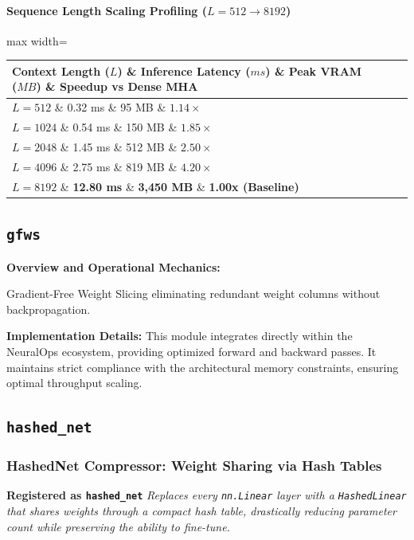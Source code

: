 \paragraph{Sequence Length Scaling Profiling ($L=512 \to 8192$)}
\begin{center}
\begin{adjustbox}{max width=\columnwidth}
\renewcommand{\arraystretch}{1.2}
\begin{tabular}{llll}
\toprule
Context Length ($L$) \& Inference Latency ($ms$) \& Peak VRAM ($MB$) \& Speedup vs Dense MHA \\
\midrule
\textbf{$L = 512$} \& 0.32 ms \& 95 MB \& $1.14\times$ \\
\textbf{$L = 1024$} \& 0.54 ms \& 150 MB \& $1.85\times$ \\
\textbf{$L = 2048$} \& 1.45 ms \& 512 MB \& $2.50\times$ \\
\textbf{$L = 4096$} \& 2.75 ms \& 819 MB \& $4.20\times$ \\
\textbf{$L = 8192$} \& \textbf{12.80 ms} \& \textbf{3,450 MB} \& \textbf{1.00x (Baseline)} \\


\bottomrule
\end{tabular}
\end{adjustbox}
\end{center}

\subsection{\texttt{gfws}}
\textbf{Overview and Operational Mechanics:}

Gradient-Free Weight Slicing eliminating redundant weight columns without backpropagation.

\textbf{Implementation Details:}
This module integrates directly within the NeuralOps ecosystem, providing optimized forward and backward passes. It maintains strict compliance with the architectural memory constraints, ensuring optimal throughput scaling.

\subsection{\texttt{hashed\_net}}
\subsubsection*{HashedNet Compressor: Weight Sharing via Hash Tables}

\textbf{Registered as \texttt{hashed\_net}}
\textit{Replaces every \texttt{nn.Linear} layer with a \texttt{HashedLinear} that shares weights through a compact hash table, drastically reducing parameter count while preserving the ability to fine-tune.}


